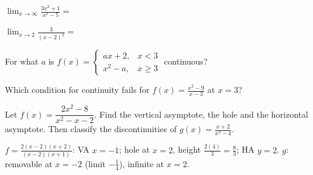 \begin{exo}{}
$\displaystyle\lim_{x\to\infty}\frac{3x^2+1}{x^2-5}=$
\end{exo}
\begin{exo}{}
$\displaystyle\lim_{x\to2}\frac{3}{(x-2)^2}=$
\end{exo}
\begin{exo}{}
For what $a$ is $f(x)=\begin{cases}ax+2, & x<3\\ x^2-a, & x\ge3\end{cases}$ continuous?
\end{exo}
\begin{exo}{}
Which condition for continuity fails for $f(x)=\frac{x^2-9}{x-3}$ at $x=3$?
\end{exo}
\begin{exo}{}
Let $f(x)=\dfrac{2x^2-8}{x^2-x-2}$. Find the vertical asymptote, the hole and the horizontal asymptote. Then classify the discontinuities of $g(x)=\frac{x+2}{x^2-4}$.
\work{3.5cm}
\begin{solution}
$f=\frac{2(x-2)(x+2)}{(x-2)(x+1)}$: VA $x=-1$; hole at $x=2$, height $\frac{2(4)}{3}=\frac83$; HA $y=2$. \;$g$: removable at $x=-2$ (limit $-\frac14$), infinite at $x=2$.
\end{solution}
\end{exo}

